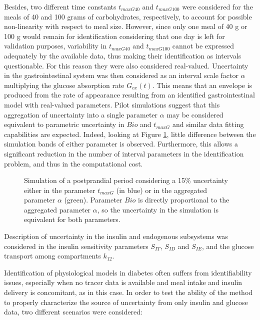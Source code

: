 Besides, two different time constants $t_{maxG40}$ and $t_{maxG100}$ were considered for the meals of 40 and 100 grams of carbohydrates, respectively, to account for possible non-linearity with respect to meal size. However, since only one meal of 40 g or 100 g would remain for identification considering that one day is left for validation purposes, variability in $t_{maxG40}$ and $t_{maxG100}$ cannot be expressed adequately by the available data, thus making their identification as intervals questionable. For this reason they were also considered real-valued. 
Uncertainty in the gastrointestinal system was then considered as an interval scale factor $\alpha$ multiplying the glucose absorption rate $G_{ex}(t)$. This means that an envelope is produced from the rate of appearance resulting from an identified gastrointestinal model with real-valued parameters. Pilot simulations suggest that this aggregation of uncertainty into a single parameter $\alpha$ may be considered equivalent to parametric uncertainty in $Bio$ and $t_{maxG}$ and similar data fitting capabilities are expected. Indeed, looking at Figure \ref{fig:tmaxvsalpha}, little difference between the simulation bands of either parameter is observed. Furthermore, this allows a significant reduction in the number of interval parameters in the identification problem, and thus in the computational cost.

\begin{figure}[hbtp]
\centering
{}\caption{Simulation of a postprandial period considering a 15\% uncertainty either in the parameter $t_{maxG}$ (in blue) or in the aggregated parameter $\alpha$ (green). Parameter $Bio$ is directly proportional to the aggregated parameter $\alpha$, so the uncertainty in the simulation is equivalent for both parameters.}
\label{fig:tmaxvsalpha}
\end{figure}

Description of uncertainty in the insulin and endogenous subsystems was considered in the insulin sensitivity parameters $S_{IT}$, $S_{ID}$ and $S_{IE}$, and the glucose transport among compartments $k_{12}$.

Identification of physiological models in diabetes often suffers from identifiability issues, especially when no tracer data is available and meal intake and insulin delivery is concomitant, as in this case. In order to test the ability of the method to properly characterize the source of uncertainty from only insulin and glucose data, two different scenarios were considered:

